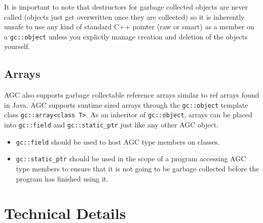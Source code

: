 \documentclass[11pt]{article}
\begin{document}
It is important to note that destructors for garbage collected objects are never called (objects just get overwritten once 
they are collected) so it is inherently  unsafe to use any kind of standard C++ pointer (raw or smart) as a member
on a \texttt{gc::object} unless you explictly manage creation and deletion of the objects yourself.

\subsection{Arrays}
AGC also supports garbage collectable reference arrays similar to ref arrays found in Java.
AGC supports suntime sized arrays through the \texttt{gc::object} template class \texttt{gc::array<class T>}.
As an inheritor of \texttt{gc::object}, arrays can be placed into \texttt{gc::field} and \texttt{gc::static\_ptr} 
just like any other AGC object.
\begin{itemize}
\item \texttt{gc::field} should be used to host AGC type members on classes.
\item \texttt{gc::static\_ptr} should be used in the scope of a program accessing AGC type 
members to ensure that it is not going to be garbage collected before the program has finished using it.
\end{itemize}

\section{Technical Details}
\end{document}
